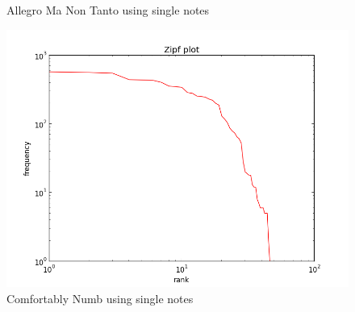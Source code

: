 \documentclass[10pt]{book}
\begin{document}
\begin{figure}[!htb]
  \caption{Allegro Ma Non Tanto using single notes}\label{fig:rach_notes_1}
\endminipage\hfill
{}%
  \includegraphics[width=\linewidth]{comf_notes_1}
  \caption{Comfortably Numb using single notes}\label{fig:comf_notes_1}
\endminipage
\end{figure}
\end{document}

